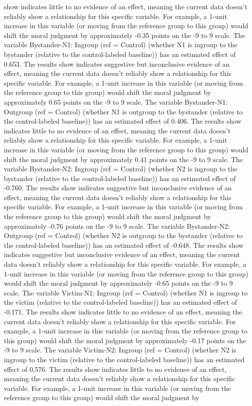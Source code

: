 \documentclass[11pt]{article}
\begin{document}
show indicates little to no evidence of an effect, meaning the current data doesn't reliably show a relationship for this specific variable. For example, a 1-unit increase in this variable (or moving from the reference group to this group) would shift the moral judgment by approximately -0.35 points on the -9 to 9 scale. The variable Bystander-N1: Ingroup (ref = Control) (whether N1 is ingroup to the bystander (relative to the control-labeled baseline)) has an estimated effect of 0.653. The results show indicates suggestive but inconclusive evidence of an effect, meaning the current data doesn't reliably show a relationship for this specific variable. For example, a 1-unit increase in this variable (or moving from the reference group to this group) would shift the moral judgment by approximately 0.65 points on the -9 to 9 scale. The variable Bystander-N1: Outgroup (ref = Control) (whether N1 is outgroup to the bystander (relative to the control-labeled baseline)) has an estimated effect of 0.406. The results show indicates little to no evidence of an effect, meaning the current data doesn't reliably show a relationship for this specific variable. For example, a 1-unit increase in this variable (or moving from the reference group to this group) would shift the moral judgment by approximately 0.41 points on the -9 to 9 scale. The variable Bystander-N2: Ingroup (ref = Control) (whether N2 is ingroup to the bystander (relative to the control-labeled baseline)) has an estimated effect of -0.760. The results show indicates suggestive but inconclusive evidence of an effect, meaning the current data doesn't reliably show a relationship for this specific variable. For example, a 1-unit increase in this variable (or moving from the reference group to this group) would shift the moral judgment by approximately -0.76 points on the -9 to 9 scale. The variable Bystander-N2: Outgroup (ref = Control) (whether N2 is outgroup to the bystander (relative to the control-labeled baseline)) has an estimated effect of -0.648. The results show indicates suggestive but inconclusive evidence of an effect, meaning the current data doesn't reliably show a relationship for this specific variable. For example, a 1-unit increase in this variable (or moving from the reference group to this group) would shift the moral judgment by approximately -0.65 points on the -9 to 9 scale. The variable Victim-N1: Ingroup (ref = Control) (whether N1 is ingroup to the victim (relative to the control-labeled baseline)) has an estimated effect of -0.171. The results show indicates little to no evidence of an effect, meaning the current data doesn't reliably show a relationship for this specific variable. For example, a 1-unit increase in this variable (or moving from the reference group to this group) would shift the moral judgment by approximately -0.17 points on the -9 to 9 scale. The variable Victim-N2: Ingroup (ref = Control) (whether N2 is ingroup to the victim (relative to the control-labeled baseline)) has an estimated effect of 0.576. The results show indicates little to no evidence of an effect, meaning the current data doesn't reliably show a relationship for this specific variable. For example, a 1-unit increase in this variable (or moving from the reference group to this group) would shift the moral judgment by 
\end{document}
